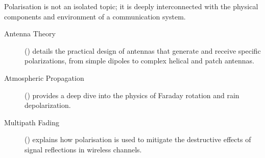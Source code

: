 \begin{importantbox}[title={Further Reading}]
    Polarisation is not an isolated topic; it is deeply interconnected with the physical components and environment of a communication system.
    \begin{description}
        \item[Antenna Theory] () details the practical design of antennas that generate and receive specific polarizations, from simple dipoles to complex helical and patch antennas.
        \item[Atmospheric Propagation] () provides a deep dive into the physics of Faraday rotation and rain depolarization.
        \item[Multipath Fading] () explains how polarisation is used to mitigate the destructive effects of signal reflections in wireless channels.
    \end{description}
\end{importantbox}